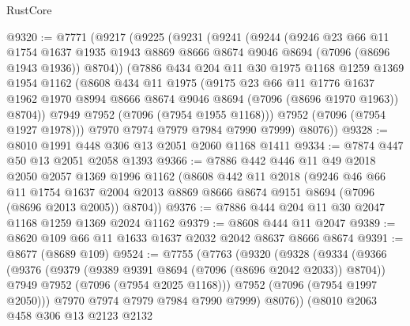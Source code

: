 \begin{lexlean}{RustCore}
\begin{coremodule}
@9320 := @7771
    (@9217
      (@9225
        (@9231
          (@9241
            (@9244
              (@9246
                @23
                @66
                @11
                @1754
                @1637
                @1935
                @1943
                @8869
                @8666
                @8674
                @9046
                @8694
                (@7096 (@8696 @1943 @1936))
                @8704))
            (@7886
              @434
              @204
              @11
              @30
              @1975
              @1168
              @1259
              @1369
              @1954
              @1162
              (@8608
                @434
                @11
                @1975
                (@9175
                  @23
                  @66
                  @11
                  @1776
                  @1637
                  @1962
                  @1970
                  @8994
                  @8666
                  @8674
                  @9046
                  @8694
                  (@7096 (@8696 @1970 @1963))
                  @8704))
              @7949
              @7952
              (@7096 (@7954 @1955 @1168)))
            @7952
            (@7096 (@7954 @1927 @1978)))
          @7970
          @7974
          @7979
          @7984
          @7990
          @7999)
        @8076))
@9328 := @8010 @1991 @448 @306 @13 @2051 @2060 @1168 @1411
@9334 := @7874 @447 @50 @13 @2051 @2058 @1393
@9366 := @7886
    @442
    @446
    @11
    @49
    @2018
    @2050
    @2057
    @1369
    @1996
    @1162
    (@8608
      @442
      @11
      @2018
      (@9246
        @46
        @66
        @11
        @1754
        @1637
        @2004
        @2013
        @8869
        @8666
        @8674
        @9151
        @8694
        (@7096 (@8696 @2013 @2005))
        @8704))
@9376 := @7886 @444 @204 @11 @30 @2047 @1168 @1259 @1369 @2024 @1162
@9379 := @8608 @444 @11 @2047
@9389 := @8620 @109 @66 @11 @1633 @1637 @2032 @2042 @8637 @8666 @8674
@9391 := @8677 (@8689 @109)
@9524 := @7755
    (@7763
      (@9320
        (@9328
          (@9334
            (@9366
              (@9376
                (@9379 (@9389 @9391 @8694 (@7096 (@8696 @2042 @2033)) @8704))
                @7949
                @7952
                (@7096 (@7954 @2025 @1168)))
              @7952
              (@7096 (@7954 @1997 @2050)))
            @7970
            @7974
            @7979
            @7984
            @7990
            @7999)
          @8076))
      (@8010
        @2063
        @458
        @306
        @13
        @2123
        @2132

\end{coremodule}
\end{lexlean}
